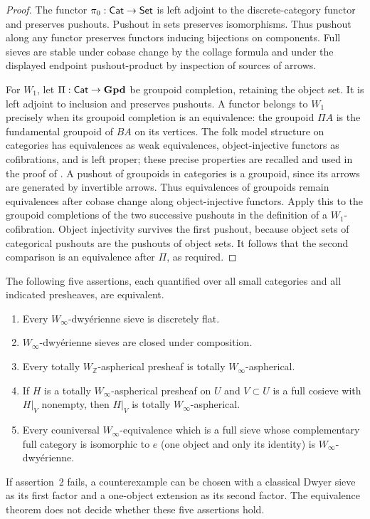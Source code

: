 \begin{proof}
The functor $\pi_0:\mathsf{Cat}\to\mathsf{Set}$ is left adjoint to
the discrete-category functor and preserves pushouts.
Pushout in sets preserves isomorphisms. Thus pushout
along any functor preserves functors inducing
bijections on components. Full sieves are stable under
cobase change by the collage formula and under the
displayed endpoint pushout-product by inspection of
sources of arrows.

For $W_1$, let $\Pi:\mathsf{Cat}\to\mathbf{Gpd}$ be
groupoid completion, retaining the object set.
It is left adjoint to inclusion and preserves
pushouts. A functor belongs to $W_1$ precisely
when its groupoid completion is an equivalence:
the groupoid $\Pi A$ is the fundamental groupoid
of $BA$ on its vertices. The folk model structure
on categories has equivalences as weak equivalences,
object-injective functors as cofibrations, and is
left proper; these precise properties are recalled
and used in the proof of
\citet[Theorem~1.6]{F_HORR2024}. A pushout of
groupoids in categories is a groupoid, since
its arrows are generated by invertible arrows.
Thus equivalences of groupoids remain equivalences
after cobase change along object-injective
functors. Apply this to the groupoid completions
of the two successive pushouts in the definition
of a $W_1$-cofibration. Object injectivity survives
the first pushout, because object sets of
categorical pushouts are the pushouts of object
sets. It follows that the second comparison
is an equivalence after $\Pi$, as required.
\end{proof}

\begin{theorem}\label{F:remaining-equivalence}
The following five assertions, each quantified over all small
categories and all indicated presheaves, are equivalent.
\begin{enumerate}
\item Every $W_\infty$-dwy\'erienne sieve is discretely flat.
\item $W_\infty$-dwy\'erienne sieves are closed under composition.
\item Every totally $W_{\mathbb Z}$-aspherical presheaf is totally
$W_\infty$-aspherical.
\item If $H$ is a totally $W_\infty$-aspherical presheaf on $U$
and $V\subset U$ is a full cosieve with $H|_V$ nonempty, then
$H|_V$ is totally $W_\infty$-aspherical.
\item Every couniversal $W_\infty$-equivalence which is a
full sieve whose complementary full category is isomorphic
to $e$ (one object and only its identity) is
$W_\infty$-dwy\'erienne.
\end{enumerate}
If assertion~2 fails, a counterexample can be chosen with a
classical Dwyer sieve as its first factor and a one-object
extension as its second factor. The equivalence theorem does
not decide whether these five assertions hold.
\end{theorem}

